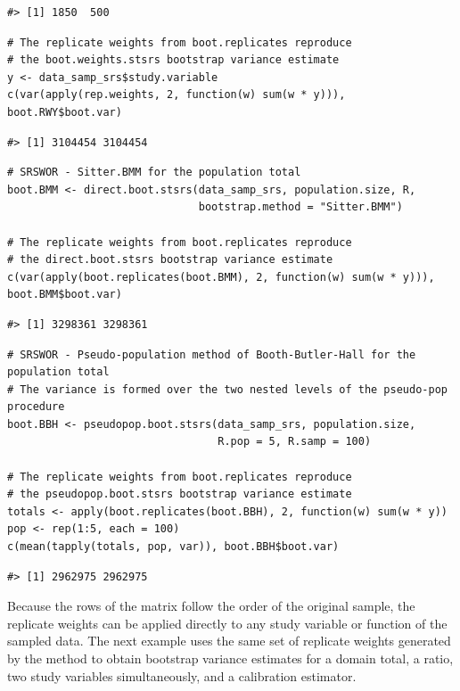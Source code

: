 \begin{verbatim}
#> [1] 1850  500
\end{verbatim}

\begin{verbatim}
# The replicate weights from boot.replicates reproduce 
# the boot.weights.stsrs bootstrap variance estimate
y <- data_samp_srs$study.variable
c(var(apply(rep.weights, 2, function(w) sum(w * y))), boot.RWY$boot.var)
\end{verbatim}

\begin{verbatim}
#> [1] 3104454 3104454
\end{verbatim}

\begin{verbatim}
# SRSWOR - Sitter.BMM for the population total
boot.BMM <- direct.boot.stsrs(data_samp_srs, population.size, R,
                              bootstrap.method = "Sitter.BMM")

# The replicate weights from boot.replicates reproduce 
# the direct.boot.stsrs bootstrap variance estimate
c(var(apply(boot.replicates(boot.BMM), 2, function(w) sum(w * y))), boot.BMM$boot.var)
\end{verbatim}

\begin{verbatim}
#> [1] 3298361 3298361
\end{verbatim}

\begin{verbatim}
# SRSWOR - Pseudo-population method of Booth-Butler-Hall for the population total
# The variance is formed over the two nested levels of the pseudo-pop procedure
boot.BBH <- pseudopop.boot.stsrs(data_samp_srs, population.size,
                                 R.pop = 5, R.samp = 100)

# The replicate weights from boot.replicates reproduce 
# the pseudopop.boot.stsrs bootstrap variance estimate
totals <- apply(boot.replicates(boot.BBH), 2, function(w) sum(w * y))
pop <- rep(1:5, each = 100)
c(mean(tapply(totals, pop, var)), boot.BBH$boot.var)
\end{verbatim}

\begin{verbatim}
#> [1] 2962975 2962975
\end{verbatim}

Because the rows of the matrix follow the order of the original sample, the replicate weights can be applied directly to any study variable or function of the sampled data. The next example uses the same set of replicate weights generated by the \citet{Rao:Wu:Yue:1992} method to obtain bootstrap variance estimates for a domain total, a ratio, two study variables simultaneously, and a calibration estimator.

